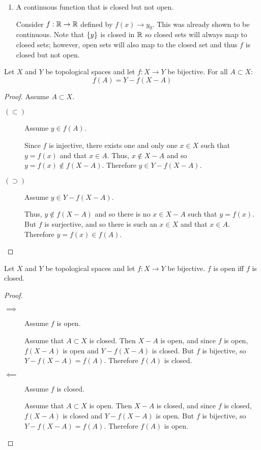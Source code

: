 \documentclass[letterpaper,12pt,fleqn]{article}
\begin{document}
\begin{example}
\begin{enumerate}
  \item A continuous function that is closed but not open.

    Consider \(f:\mathbb{R}\to\mathbb{R}\) defined by \(f(x)\to y_0\).  This was already shown to be continuous.  Note that
    \(\{y\}\) is closed in \(\mathbb{R}\) so closed sets will always map to closed sets; however, open sets will also
    map to the closed set and thus \(f\) is closed but not open.
  \end{enumerate}
\end{example}

\begin{lemma}
  Let \(X\) and \(Y\) be topological spaces and let \(f:X\to Y\) be bijective.  For all \(A\subset X\):
  \[f(A)=Y-f(X-A)\]
\end{lemma}

\begin{proof}
  Assume \(A\subset X\).
  \begin{description}
  \item[\((\subset)\)] Assume \(y\in f(A)\).

    Since \(f\) is injective, there exists one and only one \(x\in X\) such that \(y=f(x)\) and that \(x\in A\).
    Thus, \(x\notin X-A\) and so \(y=f(x)\notin f(X-A)\).  Therefore \(y\in Y-f(X-A)\).

  \item[\((\supset)\)] Assume \(y\in Y-f(X-A)\).

    Thus, \(y\notin f(X-A)\) and so there is no \(x\in X-A\) such that \(y=f(x)\).  But \(f\) is surjective, and
    so there is such an \(x\in X\) and that \(x\in A\).  Therefore \(y=f(x)\in f(A)\).
  \end{description}
\end{proof}

\begin{lemma}
  Let \(X\) and \(Y\) be topological spaces and let \(f:X\to Y\) be bijective.  \(f\) is open iff \(f\) is closed.
\end{lemma}

\begin{proof}
  \begin{description}
  \item[]
  \item[\(\implies\)] Assume \(f\) is open.

    Assume that \(A\subset X\) is closed.  Then \(X-A\) is open, and since \(f\) is open, \(f(X-A)\) is open and
    \(Y-f(X-A)\) is closed.  But \(f\) is bijective, so \(Y-f(X-A)=f(A)\).  Therefore \(f(A)\) is closed.
    
  \item[\(\impliedby\)] Assume \(f\) is closed.

    Assume that \(A\subset X\) is open.  Then \(X-A\) is closed, and since \(f\) is closed, \(f(X-A)\) is closed and
    \(Y-f(X-A)\) is open.  But \(f\) is bijective, so \(Y-f(X-A)=f(A)\).  Therefore \(f(A)\) is open.
  \end{description}
\end{proof}
\end{document}
